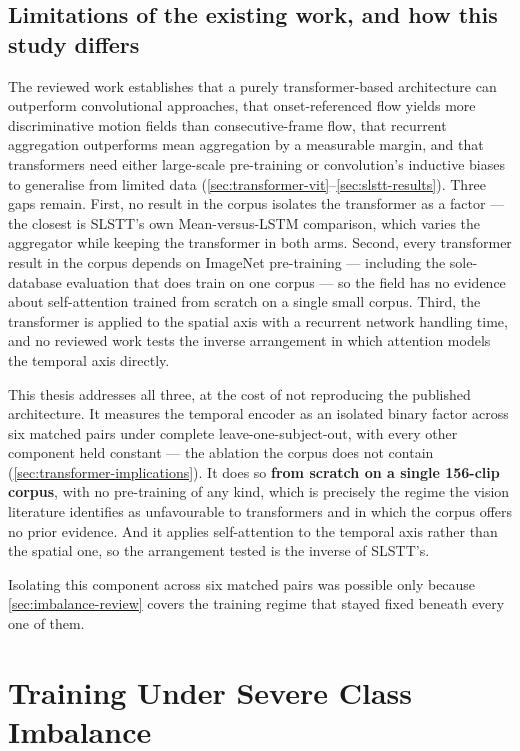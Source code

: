 \subsection{Limitations of the existing work, and how this study differs}
\label{sec:transformer-gap}

The reviewed work establishes that a purely transformer-based architecture can outperform convolutional approaches, that onset-referenced flow yields more discriminative motion fields than consecutive-frame flow, that recurrent aggregation outperforms mean aggregation by a measurable margin, and that transformers need either large-scale pre-training or convolution's inductive biases to generalise from limited data (\autoref{sec:transformer-vit}--\autoref{sec:slstt-results}). Three gaps remain. First, no result in the corpus isolates the transformer as a factor --- the closest is SLSTT's own Mean-versus-LSTM comparison, which varies the aggregator while keeping the transformer in both arms. Second, every transformer result in the corpus depends on ImageNet pre-training --- including the sole-database evaluation that does train on one corpus --- so the field has no evidence about self-attention trained from scratch on a single small corpus. Third, the transformer is applied to the spatial axis with a recurrent network handling time, and no reviewed work tests the inverse arrangement in which attention models the temporal axis directly.

This thesis addresses all three, at the cost of not reproducing the published architecture. It measures the temporal encoder as an isolated binary factor across six matched pairs under complete leave-one-subject-out, with every other component held constant --- the ablation the corpus does not contain (\autoref{sec:transformer-implications}). It does so \textbf{from scratch on a single 156-clip corpus}, with no pre-training of any kind, which is precisely the regime the vision literature identifies as unfavourable to transformers and in which the corpus offers no prior evidence. And it applies self-attention to the temporal axis rather than the spatial one, so the arrangement tested is the inverse of SLSTT's.

Isolating this component across six matched pairs was possible only because \autoref{sec:imbalance-review} covers the training regime that stayed fixed beneath every one of them.


\section{Training Under Severe Class Imbalance}
\label{sec:imbalance-review}

